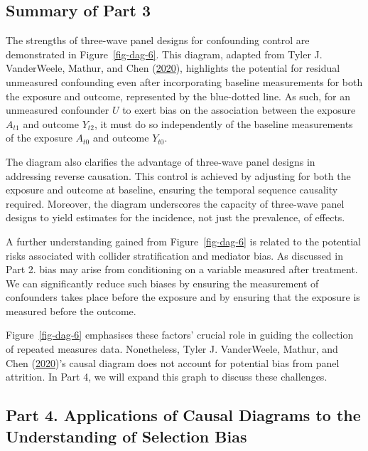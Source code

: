 \documentclass[
  singlecolumn]{report}
\begin{document}
\hypertarget{summary-of-part-3}{%
\subsection{Summary of Part 3}\label{summary-of-part-3}}

The strengths of three-wave panel designs for confounding control are
demonstrated in Figure~\ref{fig-dag-6}. This diagram, adapted from Tyler
J. VanderWeele, Mathur, and Chen
(\protect\hyperlink{ref-vanderweele2020}{2020}), highlights the
potential for residual unmeasured confounding even after incorporating
baseline measurements for both the exposure and outcome, represented by
the blue-dotted line. As such, for an unmeasured confounder \(U\) to
exert bias on the association between the exposure \(A_{t1}\) and
outcome \(Y_{t2}\), it must do so independently of the baseline
measurements of the exposure \(A_{t0}\) and outcome \(Y_{t0}\).

The diagram also clarifies the advantage of three-wave panel designs in
addressing reverse causation. This control is achieved by adjusting for
both the exposure and outcome at baseline, ensuring the temporal
sequence causality required. Moreover, the diagram underscores the
capacity of three-wave panel designs to yield estimates for the
incidence, not just the prevalence, of effects.

A further understanding gained from Figure~\ref{fig-dag-6} is related to
the potential risks associated with collider stratification and mediator
bias. As discussed in Part 2. bias may arise from conditioning on a
variable measured after treatment. We can significantly reduce such
biases by ensuring the measurement of confounders takes place before the
exposure and by ensuring that the exposure is measured before the
outcome.

Figure~\ref{fig-dag-6} emphasises these factors' crucial role in guiding
the collection of repeated measures data. Nonetheless, Tyler J.
VanderWeele, Mathur, and Chen
(\protect\hyperlink{ref-vanderweele2020}{2020})'s causal diagram does
not account for potential bias from panel attrition. In Part 4, we will
expand this graph to discuss these challenges.

\hypertarget{part-4.-applications-of-causal-diagrams-to-the-understanding-of-selection-bias}{%
\subsection{Part 4. Applications of Causal Diagrams to the Understanding
of Selection
Bias}\label{part-4.-applications-of-causal-diagrams-to-the-understanding-of-selection-bias}}
\end{document}
